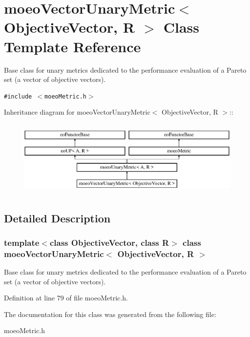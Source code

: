 \section{moeo\-Vector\-Unary\-Metric$<$ Objective\-Vector, R $>$ Class Template Reference}
\label{classmoeoVectorUnaryMetric}
Base class for unary metrics dedicated to the performance evaluation of a Pareto set (a vector of objective vectors).  


{\tt \#include $<$moeo\-Metric.h$>$}

Inheritance diagram for moeo\-Vector\-Unary\-Metric$<$ Objective\-Vector, R $>$::\begin{figure}[H]
\begin{center}
\leavevmode
\includegraphics[height=3.8488cm]{classmoeoVectorUnaryMetric}
\end{center}
\end{figure}


\subsection{Detailed Description}
\subsubsection*{template$<$class Objective\-Vector, class R$>$ class moeo\-Vector\-Unary\-Metric$<$ Objective\-Vector, R $>$}

Base class for unary metrics dedicated to the performance evaluation of a Pareto set (a vector of objective vectors). 



Definition at line 79 of file moeo\-Metric.h.

The documentation for this class was generated from the following file:\begin{CompactItemize}
\item 
moeo\-Metric.h\end{CompactItemize}
